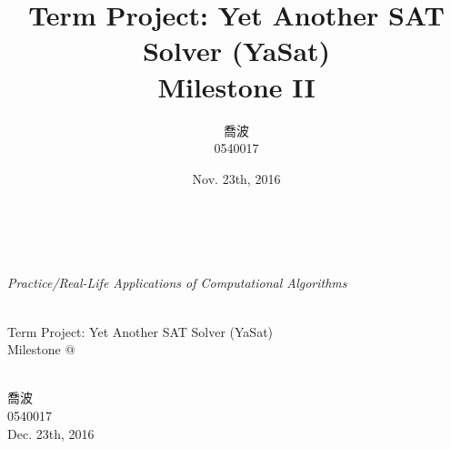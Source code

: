\documentclass[a4paper, 11.5pt]{article}
\title{Term Project: Yet Another SAT Solver (YaSat) \\ Milestone II}
\author{喬波\\0540017\\}
\date{Nov. 23th, 2016}
\makeatletter
\newcommand*{\rom}[1]{\expandafter\@slowromancap\romannumeral #1@}
\makeatother
\begin{document}

  \begin{flushleft}
    \ \\ \ \\
    \large{\em Practice/Real-Life Applications of Computational Algorithms} \\ \ 
  \end{flushleft}

  \begin{center}
    \huge{Term Project: Yet Another SAT Solver (YaSat) }\\
    \LARGE{Milestone \rom{2}}
  \end{center}
  \begin{center}
    \ \\
    喬波\\
    0540017\\
    Dec. 23th, 2016\\ \ \\ \ \\
  \end{center}
\end{document}
